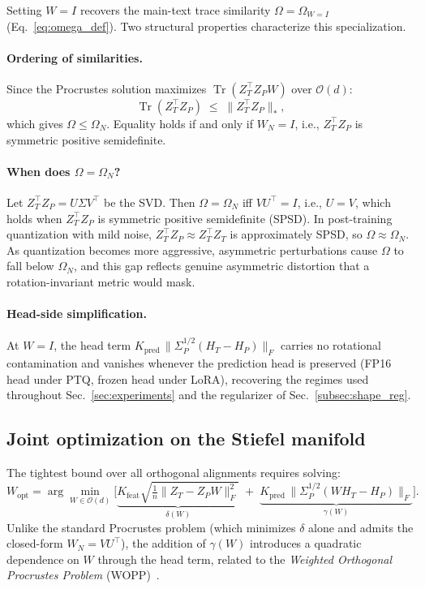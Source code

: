 Setting $W = I$ recovers the main-text trace similarity $\Omega = \Omega_{W=I}$ (Eq.~\ref{eq:omega_def}). Two structural properties characterize this specialization.

\paragraph{Ordering of similarities.}
Since the Procrustes solution maximizes $\operatorname{Tr}(Z_T^\top Z_P W)$ over $\mathcal{O}(d)$:
\begin{equation}
\operatorname{Tr}(Z_T^\top Z_P) \;\le\; \|Z_T^\top Z_P\|_*,
\end{equation}
which gives $\Omega \le \Omega_N$. Equality holds if and only if $W_N = I$, i.e., $Z_T^\top Z_P$ is symmetric positive semidefinite.

\paragraph{When does $\Omega = \Omega_N$?}
Let $Z_T^\top Z_P = U\Sigma V^\top$ be the SVD. Then $\Omega = \Omega_N$ iff $VU^\top = I$, i.e., $U = V$, which holds when $Z_T^\top Z_P$ is symmetric positive semidefinite (SPSD). In post-training quantization with mild noise, $Z_T^\top Z_P \approx Z_T^\top Z_T$ is approximately SPSD, so $\Omega \approx \Omega_N$. As quantization becomes more aggressive, asymmetric perturbations cause $\Omega$ to fall below $\Omega_N$, and this gap reflects genuine asymmetric distortion that a rotation-invariant metric would mask.

\paragraph{Head-side simplification.}
At $W = I$, the head term $K_{\mathrm{pred}}\,\|\Sigma_P^{1/2}(H_T - H_P)\|_F$ carries no rotational contamination and vanishes whenever the prediction head is preserved (FP16 head under PTQ, frozen head under LoRA), recovering the regimes used throughout Sec.~\ref{sec:experiments} and the regularizer of Sec.~\ref{subsec:shape_reg}.


\subsection{Joint optimization on the Stiefel manifold}
\label{app:joint_opt}

The tightest bound over all orthogonal alignments requires solving:
\begin{equation}
\label{eq:joint_obj}
W_{\mathrm{opt}} = \arg\min_{W \in \mathcal{O}(d)}
\Big[
\underbrace{K_{\mathrm{feat}} \sqrt{\tfrac{1}{n}\|Z_T - Z_P W\|_F^2}}_{\delta(W)}
\;+\;
\underbrace{K_{\mathrm{pred}}\,\|\Sigma_P^{1/2}(W H_T - H_P)\|_F}_{\gamma(W)}
\Big].
\end{equation}
Unlike the standard Procrustes problem (which minimizes $\delta$ alone and admits the closed-form $W_N = VU^\top$), the addition of $\gamma(W)$ introduces a quadratic dependence on $W$ through the head term, related to the \emph{Weighted Orthogonal Procrustes Problem} (WOPP)~\cite{gower2004procrustes}.

